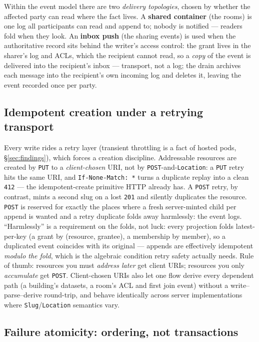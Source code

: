 \documentclass[11pt,a4paper]{article}
\theoremstyle{remark}
\newcommand{\code}[1]{\texttt{#1}}
\begin{document}
Within the event model there are two \emph{delivery topologies}, chosen by
whether the affected party can read where the fact lives. A \textbf{shared
container} (the rooms) is one log all participants can read and append to;
nobody is notified --- readers fold when they look. An \textbf{inbox push} (the
sharing events) is used when the authoritative record sits behind the writer's
access control: the grant lives in the sharer's log and ACLs, which the
recipient cannot read, so a \emph{copy} of the event is delivered into the
recipient's inbox --- transport, not a log; the drain archives each message into
the recipient's own incoming log and deletes it, leaving the event recorded once
per party.

\subsection{Idempotent creation under a retrying transport}\label{sec:idempotency}

Every write rides a retry layer (transient throttling is a fact of hosted pods,
\S\ref{sec:findings}), which forces a creation discipline. Addressable resources
are created by \code{PUT} to a \emph{client-chosen} URI, not by
\code{POST}-and-\code{Location}: a \code{PUT} retry hits the same URI, and
\code{If-None-Match:\,*} turns a duplicate replay into a clean \code{412} --- the
idempotent-create primitive HTTP already has. A \code{POST} retry, by contrast,
mints a second slug on a lost \code{201} and silently duplicates the resource.
\code{POST} is reserved for exactly the places where a fresh server-minted child
per append is wanted and a retry duplicate folds away harmlessly: the event
logs. ``Harmlessly'' is a requirement on the folds, not luck: every projection
folds latest-per-key (a grant by (resource, grantee), a membership by member),
so a duplicated event coincides with its original --- appends are effectively
idempotent \emph{modulo the fold}, which is the algebraic condition retry
safety actually needs.
Rule of thumb: resources you must \emph{address later} get client URIs; resources
you only \emph{accumulate} get \code{POST}. Client-chosen URIs also let one flow
derive every dependent path (a building's datasets, a room's ACL and first join
event) without a write--parse--derive round-trip, and behave identically across
server implementations where \code{Slug}/\code{Location} semantics vary.

\subsection{Failure atomicity: ordering, not transactions}\label{sec:atomicity}
\end{document}
